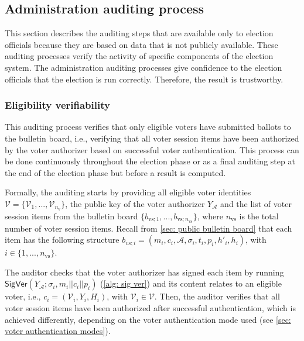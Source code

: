 \subsection{Administration auditing process} \label{sec: administration auditing process}
This section describes the auditing steps that are available only to election officials because they are based on data that is not publicly available. These auditing processes verify the activity of specific components of the election system. The administration auditing processes give confidence to the election officials that the election is run correctly. Therefore, the result is trustworthy.


\subsubsection{Eligibility verifiability}
This auditing process verifies that only eligible voters have submitted ballots to the bulletin board, i.e., verifying that all voter session items have been authorized by the voter authorizer based on successful voter authentication. This process can be done continuously throughout the election phase or as a final auditing step at the end of the election phase but before a result is computed.

Formally, the auditing starts by providing all eligible voter identities $\boldsymbol{\mathcal{V}} = \{ \mathcal{V}_1, ..., \mathcal{V}_{n_\mathrm{v}} \}$, the public key of the voter authorizer $Y_\mathcal{A}$ and the list of voter session items from the bulletin board $\{ b_{\mathrm{vs}; 1}, ..., b_{\mathrm{vs}; n_\mathrm{vs}} \}$, where $n_\mathrm{vs}$ is the total number of voter session items. Recall from \cref{sec: public bulletin board} that each item has the following structure $b_{vs; i} = (m_i, c_i, \mathcal{A}, \sigma_i, t_i, p_i, h'_i, h_i)$, with $i \in \{ 1, ..., n_\mathrm{vs} \}$.

The auditor checks that the voter authorizer has signed each item by running $\mathsf{SigVer} (Y_\mathcal{A}; \sigma_i, m_i || c_i || p_i)$ (\cref{alg: sig ver}) and its content relates to an eligible voter, i.e., $c_i = (\mathcal{V}_i, Y_i, H_i)$, with $\mathcal{V}_i \in \boldsymbol{\mathcal{V}}$. Then, the auditor verifies that all voter session items have been authorized after successful authentication, which is achieved differently, depending on the voter authentication mode used (see \cref{sec: voter authentication modes}).

